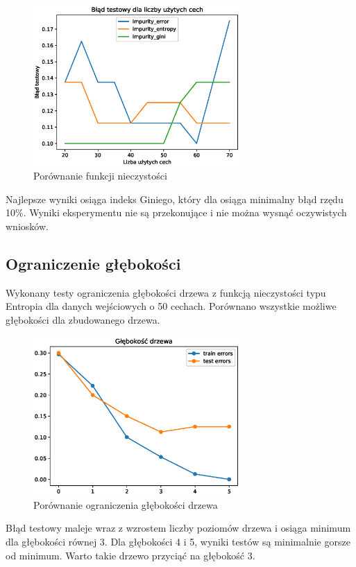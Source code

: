 \documentclass[11pt]{article}
\begin{document}
\begin{figure}[H]
\center
\includegraphics[width=0.7\textwidth]{dimensions_entropy_test}
\caption{Porównanie funkcji nieczystości}
\end{figure}

Najlepsze wyniki osiąga indeks Giniego, który dla osiąga minimalny błąd rzędu 10\%. Wyniki eksperymentu nie są przekonujące i nie można wysnąć oczywistych wniosków. 

\subsection{Ograniczenie głębokości}

Wykonany testy ograniczenia głębokości drzewa z funkcją nieczystości typu Entropia dla danych wejściowych o 50 cechach. Porównano wszystkie możliwe głębokości dla zbudowanego drzewa.

\begin{figure}[H]
\center
\includegraphics[width=0.7\textwidth]{depth_test}
\caption{Porównanie ograniczenia głębokości drzewa}
\end{figure}

Błąd testowy maleje wraz z wzrostem liczby poziomów drzewa i osiąga minimum dla głębokości równej 3. Dla głębokości 4 i 5, wyniki testów są minimalnie gorsze od minimum. Warto takie drzewo przyciąć na głębokość 3.
\end{document}
